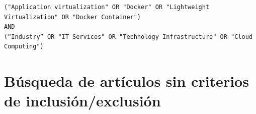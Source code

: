 \begin{tcolorbox}[
  colback=gray!5, 
  colframe=black!60, 
  title=Cadena de búsqueda en Taylor \& Francis para extensión, 
  fonttitle=\bfseries, 
  sharp corners=south
]
\scriptsize %
\begin{verbatim}
("Application virtualization" OR "Docker" OR "Lightweight Virtualization" OR "Docker Container")  
AND 
(“Industry” OR "IT Services" OR "Technology Infrastructure" OR "Cloud Computing")
\end{verbatim}
\end{tcolorbox}


\section{Búsqueda de artículos sin criterios de inclusión/exclusión}\label{sec:busqueda-sin-criterios}

